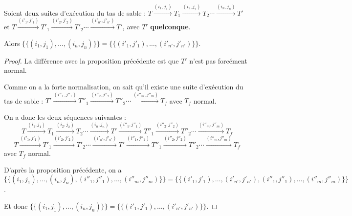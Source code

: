 \begin{theo}
Soient deux suites d'exécution du tas de sable : $T\xrightarrow{(i_1,j_1)}T_1\xrightarrow{(i_2,j_2)}T_2\cdots\xrightarrow{(i_n,j_n)}T'$ et $T\xrightarrow{(i'_1,j'_1)}T'_1\xrightarrow{(i'_2,j'_2)}T'_2\cdots\xrightarrow{(i'_{n'},j'_{n'})}T'$, avec $T'$ \textbf{quelconque}. 

Alors $\{\!\!\{(i_1, j_1), \ldots, (i_n, j_n) \}\!\!\}=\{\!\!\{(i'_1, j'_1), \ldots, (i'_{n'}, j'_{n'}) \}\!\!\}$.
\end{theo}
\begin{proof}
La différence avec la proposition précédente est que $T'$ n'est pas forcément normal.

Comme on a la forte normalisation, on sait qu'il existe une suite d'exécution du tas de sable : $T'\xrightarrow{(i''_1,j''_1)}T''_1\xrightarrow{(i''_2,j''_2)}T''_2\cdots\xrightarrow{(i''_m,j''_m)}T_f$ avec $T_f$ normal.

On a donc les deux séquences suivantes : 
$$T\xrightarrow{(i_1,j_1)}T_1\xrightarrow{(i_2,j_2)}T_2\cdots\xrightarrow{(i_n,j_n)}T'\xrightarrow{(i''_1,j''_1)}T''_1\xrightarrow{(i''_2,j''_2)}T''_2\cdots\xrightarrow{(i''_m,j''_m)}T_f$$
$$T\xrightarrow{(i'_1,j'_1)}T'_1\xrightarrow{(i'_2,j'_2)}T'_2\cdots\xrightarrow{(i'_{n'},j'_{n'})}T'\xrightarrow{(i''_1,j''_1)}T''_1\xrightarrow{(i''_2,j''_2)}T''_2\cdots\xrightarrow{(i''_m,j''_m)}T_f$$ 
avec $T_f$ normal.

D'après la proposition précédente, on a $\{\!\!\{(i_1, j_1), \ldots, (i_n, j_n), (i''_1,j''_1), \ldots, (i''_m,j''_m) \}\!\!\}=\{\!\!\{(i'_1, j'_1), \ldots, (i'_{n'}, j'_{n'}), (i''_1,j''_1), \ldots, (i''_m,j''_m) \}\!\!\}$.

Et donc $\{\!\!\{(i_1, j_1), \ldots, (i_n, j_n) \}\!\!\}=\{\!\!\{(i'_1, j'_1), \ldots, (i'_{n'}, j'_{n'}) \}\!\!\}$.
\end{proof}


\medbreak
\medbreak
\medbreak

